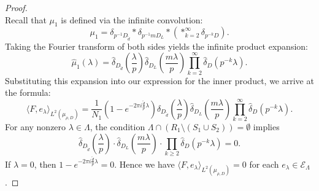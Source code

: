 \documentclass[10pt,a4paper]{amsart}
\begin{document}
\begin{proof}
\begin{equation*}
\end{equation*}
Recall that $\mu_1$ is defined via the infinite convolution:
\begin{equation*}
	\mu_1 = \delta_{p^{-1}D_{\tilde{d}}} \ast \delta_{p^{-1}mD_L} \ast \left( \mathop{\ast}_{k=2}^\infty \delta_{p^{-k}D} \right).
\end{equation*}
Taking the Fourier transform of both sides yields the infinite product expansion:
\begin{equation*}
	\widehat{\mu}_1(\lambda) = \widehat{\delta}_{D_{\tilde{d}}}\left(\frac{\lambda}{p}\right) \widehat{\delta}_{D_L}\left(\frac{m\lambda}{p}\right) \prod_{k = 2}^{\infty} \widehat{\delta}_D(p^{-k}\lambda).
\end{equation*}
Substituting this expansion into our expression for the inner product, we arrive at the formula:
\begin{equation*}
	\langle F, e_\lambda \rangle_{L^2(\mu_{\rho,D})} = \frac{1}{N_1} \left( 1 - e^{-2\pi i \frac{\tilde{d}}{p}\lambda} \right) \widehat{\delta}_{D_{\tilde{d}}}\left(\frac{\lambda}{p}\right) \widehat{\delta}_{D_L}\left(\frac{m\lambda}{p}\right) \prod_{k = 2}^{\infty} \widehat{\delta}_D(p^{-k}\lambda).
\end{equation*}
For any nonzero $\lambda \in \Lambda$, the condition $\Lambda\cap (R_1 \setminus (S_1\cup S_2))=\emptyset$ implies
$$\hat{\delta}_{D_{\tilde{d}}}(\frac{\lambda}{p}) \cdot\hat{\delta}_{D_L}(\frac{m\lambda}{p}) \cdot \prod_{k \ge 2}\hat{\delta}_D(p^{-k}\lambda)=0.$$
If $\lambda=0$, then $1- e^{-2 \pi i \frac{\tilde{d}}{p} \lambda}=0$.
Hence we have $\langle F,e_{\lambda} \rangle_{L^2(\mu_{\rho,D})}=0$ for each $e_{\lambda}\in \mathcal{E}_\Lambda$. 



\end{proof}
\end{document}
